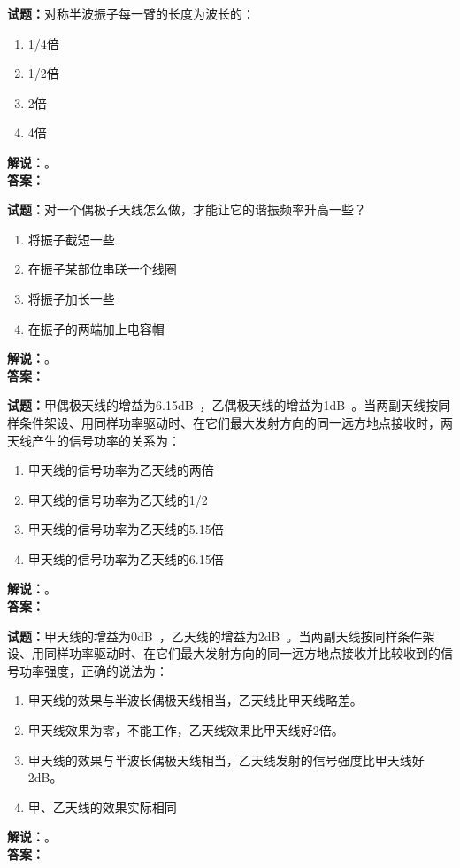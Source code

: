 \documentclass{ctexbook}
\begin{document}
\bigskip




\noindent\textbf{试题：}对称半波振子每一臂的长度为波长的：
\begin{enumerate}[leftmargin=3em]
\item 1/4倍
\item 1/2倍
\item 2倍
\item 4倍
\end{enumerate}
\noindent\textbf{解说：}\textbf{}。\\\noindent\textbf{答案：}

\bigskip




\noindent\textbf{试题：}对一个偶极子天线怎么做，才能让它的谐振频率升高一些？
\begin{enumerate}[leftmargin=3em]
\item 将振子截短一些
\item 在振子某部位串联一个线圈
\item 将振子加长一些
\item 在振子的两端加上电容帽
\end{enumerate}
\noindent\textbf{解说：}\textbf{}。\\\noindent\textbf{答案：}

\bigskip




\noindent\textbf{试题：}甲偶极天线的增益为6.15\unit[qualifier-mode=combine]{\deci\bel{}}，乙偶极天线的增益为1\unit[qualifier-mode=combine]{\deci\bel{}}。当两副天线按同样条件架设、用同样功率驱动时、在它们最大发射方向的同一远方地点接收时，两天线产生的信号功率的关系为：
\begin{enumerate}[leftmargin=3em]
\item 甲天线的信号功率为乙天线的两倍
\item 甲天线的信号功率为乙天线的1/2
\item 甲天线的信号功率为乙天线的5.15倍
\item 甲天线的信号功率为乙天线的6.15倍
\end{enumerate}
\noindent\textbf{解说：}\textbf{}。\\\noindent\textbf{答案：}

\bigskip




\noindent\textbf{试题：}甲天线的增益为0\unit[qualifier-mode=combine]{\deci\bel{}}，乙天线的增益为2\unit[qualifier-mode=combine]{\deci\bel{}}。当两副天线按同样条件架设、用同样功率驱动时、在它们最大发射方向的同一远方地点接收并比较收到的信号功率强度，正确的说法为：
\begin{enumerate}[leftmargin=3em]
\item 甲天线的效果与半波长偶极天线相当，乙天线比甲天线略差。
\item 甲天线效果为零，不能工作，乙天线效果比甲天线好2倍。
\item 甲天线的效果与半波长偶极天线相当，乙天线发射的信号强度比甲天线好2dB。
\item 甲、乙天线的效果实际相同
\end{enumerate}
\noindent\textbf{解说：}\textbf{}。\\\noindent\textbf{答案：}
\end{document}
